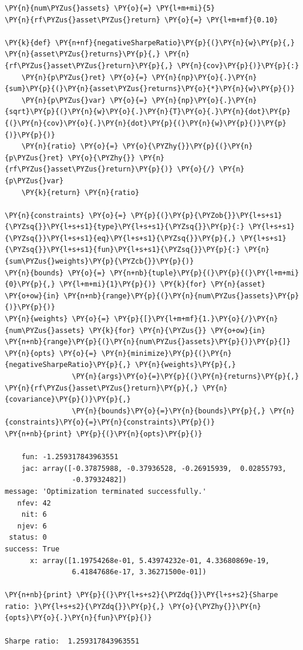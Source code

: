 \begin{tcolorbox}[breakable, size=fbox, boxrule=1pt, pad at break*=1mm,colback=cellbackground, colframe=cellborder]
\begin{Verbatim}[commandchars=\\\{\}]
\PY{n}{num\PYZus{}assets} \PY{o}{=} \PY{l+m+mi}{5}
\PY{n}{rf\PYZus{}asset\PYZus{}return} \PY{o}{=} \PY{l+m+mf}{0.10}
		
\PY{k}{def} \PY{n+nf}{negativeSharpeRatio}\PY{p}{(}\PY{n}{w}\PY{p}{,} \PY{n}{asset\PYZus{}returns}\PY{p}{,} \PY{n}{rf\PYZus{}asset\PYZus{}return}\PY{p}{,} \PY{n}{cov}\PY{p}{)}\PY{p}{:} 
    \PY{n}{p\PYZus{}ret} \PY{o}{=} \PY{n}{np}\PY{o}{.}\PY{n}{sum}\PY{p}{(}\PY{n}{asset\PYZus{}returns}\PY{o}{*}\PY{n}{w}\PY{p}{)}
    \PY{n}{p\PYZus{}var} \PY{o}{=} \PY{n}{np}\PY{o}{.}\PY{n}{sqrt}\PY{p}{(}\PY{n}{w}\PY{o}{.}\PY{n}{T}\PY{o}{.}\PY{n}{dot}\PY{p}{(}\PY{n}{cov}\PY{o}{.}\PY{n}{dot}\PY{p}{(}\PY{n}{w}\PY{p}{)}\PY{p}{)}\PY{p}{)}
    \PY{n}{ratio} \PY{o}{=} \PY{o}{\PYZhy{}}\PY{p}{(}\PY{n}{p\PYZus{}ret} \PY{o}{\PYZhy{}} \PY{n}{rf\PYZus{}asset\PYZus{}return}\PY{p}{)} \PY{o}{/} \PY{n}{p\PYZus{}var}
    \PY{k}{return} \PY{n}{ratio}
		
\PY{n}{constraints} \PY{o}{=} \PY{p}{(}\PY{p}{\PYZob{}}\PY{l+s+s1}{\PYZsq{}}\PY{l+s+s1}{type}\PY{l+s+s1}{\PYZsq{}}\PY{p}{:} \PY{l+s+s1}{\PYZsq{}}\PY{l+s+s1}{eq}\PY{l+s+s1}{\PYZsq{}}\PY{p}{,} \PY{l+s+s1}{\PYZsq{}}\PY{l+s+s1}{fun}\PY{l+s+s1}{\PYZsq{}}\PY{p}{:} \PY{n}{sum\PYZus{}weights}\PY{p}{\PYZcb{}}\PY{p}{)}
\PY{n}{bounds} \PY{o}{=} \PY{n+nb}{tuple}\PY{p}{(}\PY{p}{(}\PY{l+m+mi}{0}\PY{p}{,} \PY{l+m+mi}{1}\PY{p}{)} \PY{k}{for} \PY{n}{asset} \PY{o+ow}{in} \PY{n+nb}{range}\PY{p}{(}\PY{n}{num\PYZus{}assets}\PY{p}{)}\PY{p}{)}
\PY{n}{weights} \PY{o}{=} \PY{p}{[}\PY{l+m+mf}{1.}\PY{o}{/}\PY{n}{num\PYZus{}assets} \PY{k}{for} \PY{n}{\PYZus{}} \PY{o+ow}{in} \PY{n+nb}{range}\PY{p}{(}\PY{n}{num\PYZus{}assets}\PY{p}{)}\PY{p}{]}
\PY{n}{opts} \PY{o}{=} \PY{n}{minimize}\PY{p}{(}\PY{n}{negativeSharpeRatio}\PY{p}{,} \PY{n}{weights}\PY{p}{,} 
                \PY{n}{args}\PY{o}{=}\PY{p}{(}\PY{n}{returns}\PY{p}{,} \PY{n}{rf\PYZus{}asset\PYZus{}return}\PY{p}{,} \PY{n}{covariance}\PY{p}{)}\PY{p}{,}
                \PY{n}{bounds}\PY{o}{=}\PY{n}{bounds}\PY{p}{,} \PY{n}{constraints}\PY{o}{=}\PY{n}{constraints}\PY{p}{)}
\PY{n+nb}{print} \PY{p}{(}\PY{n}{opts}\PY{p}{)}

    fun: -1.259317843963551
    jac: array([-0.37875988, -0.37936528, -0.26915939,  0.02855793,
                -0.37932482])
message: 'Optimization terminated successfully.'
   nfev: 42
    nit: 6
   njev: 6
 status: 0
success: True
      x: array([1.19754268e-01, 5.43974232e-01, 4.33680869e-19,
                6.41847686e-17, 3.36271500e-01])

\PY{n+nb}{print} \PY{p}{(}\PY{l+s+s2}{\PYZdq{}}\PY{l+s+s2}{Sharpe ratio: }\PY{l+s+s2}{\PYZdq{}}\PY{p}{,} \PY{o}{\PYZhy{}}\PY{n}{opts}\PY{o}{.}\PY{n}{fun}\PY{p}{)}

Sharpe ratio:  1.259317843963551
\end{Verbatim}
\end{tcolorbox}

